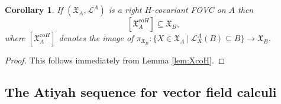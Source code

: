 \documentclass{article}
\newtheorem{corollary}[thm]{Corollary}
\theoremstyle{definition}
\begin{document}
\begin{corollary}
	If $(\mathfrak{X}_A,\mathscr{L}^A)$ is a right $H$-covariant FOVC on $A$ then
	$$
	[\mathfrak{X}_A^{\mathrm{co}H}]\subseteq\mathfrak{X}_B,
	$$
	where $[\mathfrak{X}_A^{\mathrm{co}H}]$ denotes the image of $\pi_{\mathfrak{X}_B}\colon\{X\in\mathfrak{X}_A~|~\mathscr{L}^A_X(B)\subseteq B\}\to\mathfrak{X}_B$.
\end{corollary}
\begin{proof}
	This follows immediately from Lemma \ref{lem:XcoH}.
\end{proof}



\subsection{The Atiyah sequence for vector field calculi}\label{sec:Atiyah}
\end{document}

